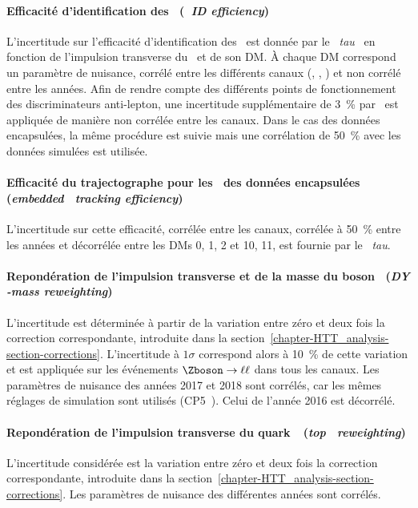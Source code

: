 \paragraph{Efficacité d'identification des \tauh\ (\emph{\tauh\ ID efficiency})}
L'incertitude sur l'efficacité d'identification des \tauh\ est donnée par le \POG\ \emph{tau}~\cite{TauPOG}
en fonction de l'impulsion transverse du \tauh\ et de son DM.
À chaque DM correspond un paramètre de nuisance, corrélé entre les différents canaux (\tauh\tauh, \mu\tauh, \ele\tauh) et non corrélé entre les années.
Afin de rendre compte des différents points de fonctionnement des discriminateurs anti-lepton, une incertitude supplémentaire de \SI{3}{\%} par \tauh\ est appliquée de manière non corrélée entre les canaux.
Dans le cas des données encapsulées, la même procédure est suivie mais une corrélation de \SI{50}{\%} avec les données simulées est utilisée.
\paragraph{Efficacité du trajectographe pour les \tauh\ des données encapsulées (\emph{embedded \tauh\ tracking efficiency})}
L'incertitude sur cette efficacité,
corrélée entre les canaux,
corrélée à \SI{50}{\%} entre les années et
décorrélée entre les DMs 0, 1, 2 et 10, 11, 
est fournie par le \POG\ \emph{tau}.
\paragraph{Repondération de l'impulsion transverse et de la masse du boson \Zboson\ (\emph{DY \pT-mass reweighting})}
L'incertitude est déterminée à partir de la variation entre zéro et deux fois la correction correspondante, introduite dans la section~\ref{chapter-HTT_analysis-section-corrections}.
L'incertitude à $1\sigma$ correspond alors à \SI{10}{\%} de cette variation et est appliquée sur les événements $\Zboson\to\ell\ell$ dans tous les canaux.
Les paramètres de nuisance des années 2017 et 2018 sont corrélés, car les mêmes réglages de simulation sont utilisés (CP5~\cite{tunes_2019}).
Celui de l'année 2016 est décorrélé.
\paragraph{Repondération de l'impulsion transverse du quark~\quarkt\ (\emph{top \pT\ reweighting})}
L'incertitude considérée est la variation entre zéro et deux fois la correction correspondante, introduite dans la section~\ref{chapter-HTT_analysis-section-corrections}.
Les paramètres de nuisance des différentes années sont corrélés.
